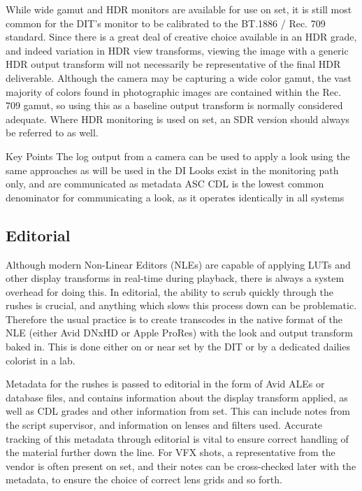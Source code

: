 While wide gamut and HDR monitors are available for use on set, it is still most common for the DIT’s monitor to be calibrated to the BT.1886 / Rec. 709 standard. Since there is a great deal of creative choice available in an HDR grade, and indeed variation in HDR view transforms, viewing the image with a generic HDR output transform will not necessarily be representative of the final HDR deliverable. Although the camera may be capturing a wide color gamut, the vast majority of colors found in photographic images are contained within the Rec. 709 gamut, so using this as a baseline output transform is normally considered adequate. Where HDR monitoring is used on set, an SDR version should always be referred to as well.

Key Points
The log output from a camera can be used to apply a look using the same approaches as will be used in the DI
Looks exist in the monitoring path only, and are communicated as metadata
ASC CDL is the lowest common denominator for communicating a look, as it operates identically in all systems


\subsection{Editorial}

Although modern Non-Linear Editors (NLEs) are capable of applying LUTs and other display transforms in real-time during playback, there is always a system overhead for doing this. In editorial, the ability to scrub quickly through the rushes is crucial, and anything which slows this process down can be problematic. Therefore the usual practice is to create transcodes in the native format of the NLE (either Avid DNxHD or Apple ProRes) with the look and output transform baked in. This is done either on or near set by the DIT or by a dedicated dailies colorist in a lab.

Metadata for the rushes is passed to editorial in the form of Avid ALEs or database files, and contains information about the display transform applied, as well as CDL grades and other information from set. This can include notes from the script supervisor, and information on lenses and filters used. Accurate tracking of this metadata through editorial is vital to ensure correct handling of the material further down the line. For VFX shots, a representative from the vendor is often present on set, and their notes can be cross-checked later with the metadata, to ensure the choice of correct lens grids and so forth.

